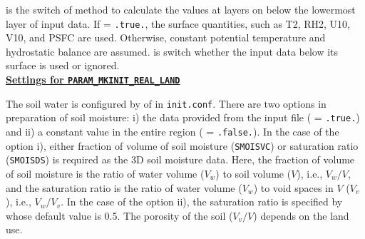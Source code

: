  is the switch of method to calculate the values at layers on \scale below the lowermost layer of input data.
If  = \verb|.true.|, the surface quantities, such as T2, RH2, U10, V10, and PSFC are used.
Otherwise, constant potential temperature and hydrostatic balance are assumed.
 is switch whether the input data below its surface is used or ignored.
\\

\noindent\textbf{\underline{Settings for \texttt{PARAM\_MKINIT\_REAL\_LAND}}}

The soil water is configured by  of  in \verb|init.conf|.
There are two options in preparation of soil moisture: i) the data provided from the input file ( = \verb|.true.|) and ii) a constant value in the entire region ( = \verb|.false.|).
In the case of the option i), either fraction of volume of soil moisture (\verb|SMOISVC|) or saturation ratio (\verb|SMOISDS|) is required as the 3D soil moisture data.
Here, the fraction of volume of soil moisture is the ratio of water volume ($V_w$) to soil volume ($V$), i.e., $V_w / V$, 
and the saturation ratio is the ratio of water volume ($V_w$) to void spaces in $V$ ($V_v$), i.e., $V_w / V_v$.
%
In the case of the option ii), the saturation ratio is specified by  whose default value is 0.5.
The porosity of the soil ($V_v/V$) depends on the land use.

